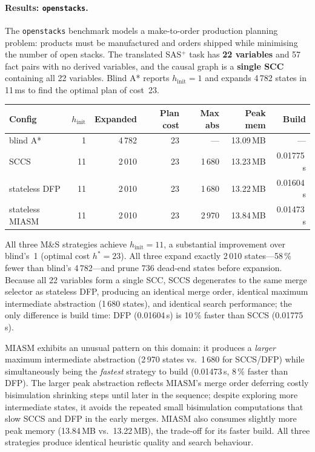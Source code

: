 \documentclass[11pt,a4paper]{article}
\begin{document}
\paragraph{Results: \texttt{openstacks}.}

The \texttt{openstacks} benchmark models a make-to-order production planning
problem: products must be manufactured and orders shipped while minimising
the number of open stacks.
The translated SAS$^+$ task has \textbf{22 variables} and 57 fact pairs with
no derived variables, and the causal graph is a \textbf{single SCC} containing
all 22 variables.
Blind A* reports $h_{\mathrm{init}} = 1$ and expands 4\,782 states in 11\,ms
to find the optimal plan of cost~23.

\begin{center}
\small
\begin{tabular}{lrrrrrr}
\toprule
\textbf{Config} & \textbf{$h_{\mathrm{init}}$} & \textbf{Expanded}
  & \textbf{Plan cost} & \textbf{Max abs} & \textbf{Peak mem} & \textbf{Build} \\
\midrule
blind A*            &  1 & 4\,782 & 23 & ---   & 13.09\,MB & ---       \\
SCCS                & 11 & 2\,010 & 23 & 1\,680 & 13.23\,MB & 0.01775\,s  \\
stateless DFP       & 11 & 2\,010 & 23 & 1\,680 & 13.22\,MB & 0.01604\,s  \\
stateless MIASM     & 11 & 2\,010 & 23 & 2\,970 & 13.84\,MB & 0.01473\,s  \\
\bottomrule
\end{tabular}
\end{center}

All three M\&S strategies achieve $h_{\mathrm{init}} = 11$, a substantial
improvement over blind's~1 (optimal cost $h^* = 23$).
All three expand exactly 2\,010 states---58\,\% fewer than blind's 4\,782---and
prune 736 dead-end states before expansion.
Because all 22 variables form a single SCC, SCCS degenerates to the same
merge selector as stateless DFP, producing an identical merge order, identical
maximum intermediate abstraction (1\,680 states), and identical search
performance; the only difference is build time: DFP (0.01604\,s) is 10\,\%
faster than SCCS (0.01775\,s).

MIASM exhibits an unusual pattern on this domain: it produces a
\emph{larger} maximum intermediate abstraction (2\,970 states vs.\ 1\,680 for
SCCS/DFP) while simultaneously being the \emph{fastest} strategy to build
(0.01473\,s, 8\,\% faster than DFP).
The larger peak abstraction reflects MIASM's merge order deferring costly
bisimulation shrinking steps until later in the sequence; despite exploring
more intermediate states, it avoids the repeated small bisimulation
computations that slow SCCS and DFP in the early merges.
MIASM also consumes slightly more peak memory (13.84\,MB vs.\ 13.22\,MB),
the trade-off for its faster build.
All three strategies produce identical heuristic quality and search behaviour.
\end{document}
